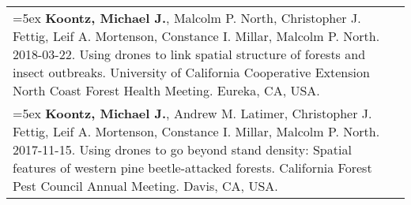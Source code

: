 \begin{longtable}{@{}>{\raggedright}p{5.25in} @{} >{\raggedleft}X@{}}
\hangindent=5ex \textbf{Koontz, Michael J.}, Malcolm P. North, Christopher J. Fettig, Leif A. Mortenson, Constance I. Millar, Malcolm P. North. 2018-03-22. Using drones to link spatial structure of forests and insect outbreaks. University of California Cooperative Extension North Coast Forest Health Meeting. Eureka, CA, USA. & 2018 \tabularnewline

\hangindent=5ex \textbf{Koontz, Michael J.}, Andrew M. Latimer, Christopher J. Fettig, Leif A. Mortenson, Constance I. Millar, Malcolm P. North. 2017-11-15. Using drones to go beyond stand density: Spatial features of western pine beetle-attacked forests. California Forest Pest Council Annual Meeting. Davis, CA, USA. & 2017

\end{longtable}
